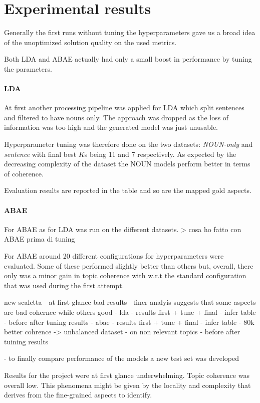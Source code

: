 \section{Experimental results}
Generally the first runs without tuning the hyperparameters gave us a broad idea
of the unoptimized solution quality on the used metrics.

Both LDA and ABAE actually had only a small boost in performance by tuning the parameters.

\paragraph{LDA}
At first another processing pipeline was applied for LDA which split sentences and filtered to have nouns only.
The approach was dropped as the loss of information was too high and the generated model was just unusable.

Hyperparameter tuning was therefore done on the two datasets: \textit{NOUN-only} and \textit{sentence}
with final best $K$s being 11 and 7 respectively.
As expected by the decreasing complexity of the dataset the NOUN models perform better in terms of coherence.

Evaluation results are reported in the table and so are the mapped gold aspects.



\paragraph{ABAE}
For ABAE as for LDA was run on the different datasets.
> cosa ho fatto con ABAE prima di tuning

For ABAE around 20 different configurations for hyperparameters were evaluated.
Some of these performed slightly better than others but, overall, there only was a minor gain in topic coherence with
w.r.t the standard configuration that was used during the first attempt.

new scaletta
- at first glance bad results
- finer analyis suggests that some aspects are bad cohernec while others good
- lda
- results first + tune + final
- infer table
- before after tuning results
- abae
- results first + tune + final
- infer table
- 80k better cohrence ->  unbalanced dataset
- on non relevant topics
- before after tuining results

- to finally compare performance of the models a new test set was developed

Results for the project were at first glance underwhelming.
Topic coherence was overall low.
This phenomena might be given by the locality and complexity that derives from the fine-grained aspects to identify.

